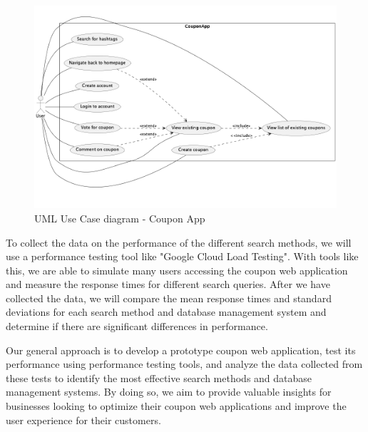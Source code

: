 \begin{figure}[h]
    \centering
    \includegraphics[scale=0.25]{resources/use_case.png}
    \caption{UML Use Case diagram - Coupon App}
    \label{fig:useCaseCouponApp}
\end{figure}

To collect the data on the performance of the different search methods, we will use a performance testing tool like "Google Cloud Load Testing". With tools like this, we are able to simulate many users accessing the coupon web application and measure the response times for different search queries. After we have collected the data, we will compare the mean response times and standard deviations for each search method and database management system and determine if there are significant differences in performance.

Our general approach is to develop a prototype coupon web application, test its performance using performance testing tools, and analyze the data collected from these tests to identify the most effective search methods and database management systems. By doing so, we aim to provide valuable insights for businesses looking to optimize their coupon web applications and improve the user experience for their customers.